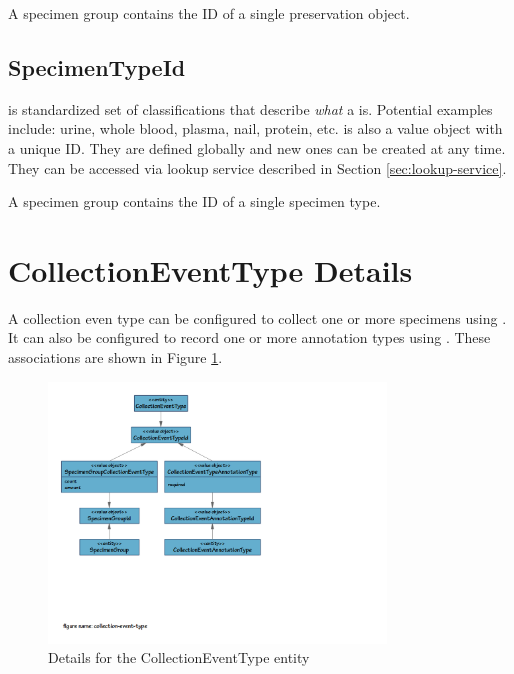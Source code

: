 A specimen group contains the ID of a single preservation object.

\subsection*{SpecimenTypeId}

 is standardized set of classifications that describe
\emph{what} a  is. Potential examples include: urine,
whole blood, plasma, nail, protein, etc.  is also a
value object with a unique ID. They are defined globally and new ones can be
created at any time. They can be accessed via lookup service described in
Section \ref{sec:lookup-service}.

A specimen group contains the ID of a single specimen type.

\section{CollectionEventType Details}
\label{sec:collection-event-type}

A collection even type can be configured to collect one or more specimens using
. It can also be configured to
record one or more annotation types using
. These associations are shown in
Figure \ref{fig:collection-event-type}.

\begin{figure}[H]
  \centering
  \includegraphics[trim={9mm 70mm 96mm 9mm}, clip,
    width=0.8\textwidth]{images/collection-event-type}
  \caption{Details for the CollectionEventType entity}
  \label{fig:collection-event-type}
\end{figure}

